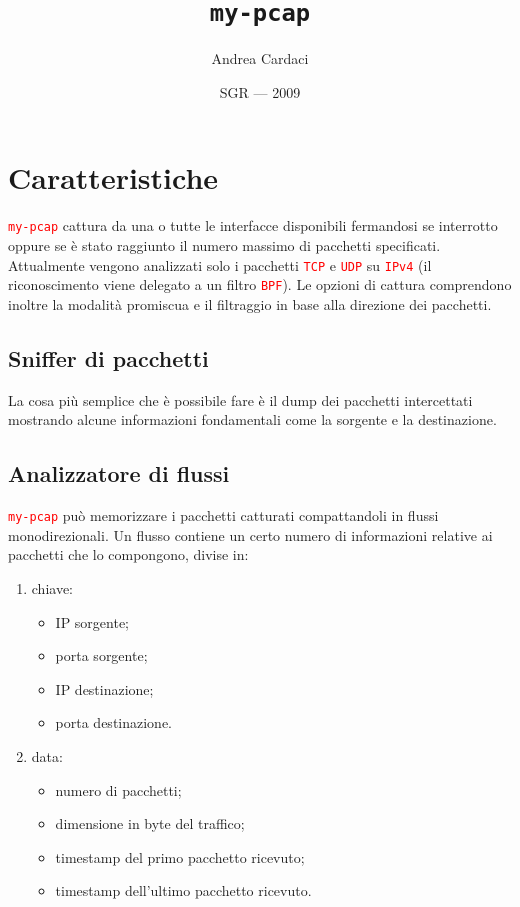 \documentclass[a4paper,11pt]{article}
\title{\Huge\tt my-pcap}
\author{Andrea Cardaci}
\date{SGR --- 2009}
\newcommand\code[1]{\textcolor{red}{\texttt{#1}}}
\begin{document}
\maketitle

\section{Caratteristiche} \label{par:features}
\code{my-pcap} cattura da una o tutte le interfacce disponibili
fermandosi se interrotto oppure se è stato raggiunto il numero massimo
di pacchetti specificati. Attualmente vengono analizzati solo i
pacchetti \code{TCP} e \code{UDP} su \code{IPv4} (il riconoscimento
viene delegato a un filtro \code{BPF}). Le opzioni di cattura
comprendono inoltre la modalità promiscua e il filtraggio in base alla
direzione dei pacchetti.

\subsection{Sniffer di pacchetti}
La cosa più semplice che è possibile fare è il dump dei pacchetti
intercettati mostrando alcune informazioni fondamentali come la
sorgente e la destinazione.

\subsection{Analizzatore di flussi} \label{par:flows}
\code{my-pcap} può memorizzare i pacchetti catturati compattandoli in
flussi monodirezionali. Un flusso contiene un certo numero di
informazioni relative ai pacchetti che lo compongono, divise in:

\begin{enumerate}
\item chiave:
  \begin{itemize}
  \item IP sorgente;
  \item porta sorgente;
  \item IP destinazione;
  \item porta destinazione.
  \end{itemize}
\item data:
  \begin{itemize}
    \item numero di pacchetti;
    \item dimensione in byte del traffico;
    \item timestamp del primo pacchetto ricevuto;
    \item timestamp dell'ultimo pacchetto ricevuto.
  \end{itemize}
\end{enumerate}
\end{document}
